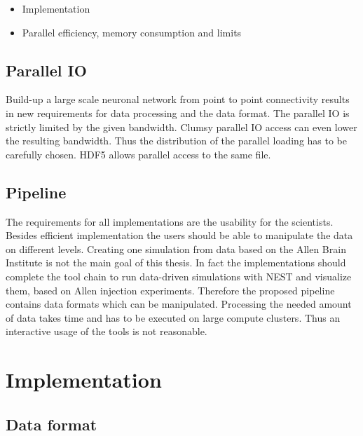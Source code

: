 \documentclass[a4paper]{article}
\begin{document}
\begin{itemize}
      \item Implementation
      \item Parallel efficiency, memory consumption and limits
   \end{itemize}

\subsection{Parallel IO}
Build-up a large scale neuronal network from point to point connectivity results in new requirements for data processing and the data format. The parallel IO is strictly limited by the given bandwidth. Clumsy parallel IO access can even lower the resulting bandwidth.
Thus the distribution of the parallel loading has to be carefully chosen. HDF5 allows parallel access to the same file.

\subsection{Pipeline}
The requirements for all implementations are the usability for the scientists. Besides efficient implementation the users should be able to manipulate the data on different levels. Creating one simulation from data based on the Allen Brain Institute is not the main goal of this thesis. In fact the implementations should complete the tool chain to run data-driven simulations with NEST and visualize them, based on Allen injection experiments. Therefore the proposed pipeline contains data formats which can be manipulated. Processing the needed amount of data takes time and has to be executed on large compute clusters. Thus an interactive usage of the tools is not reasonable.

\newpage
\section{Implementation}

\subsection{Data format}
\end{document}
